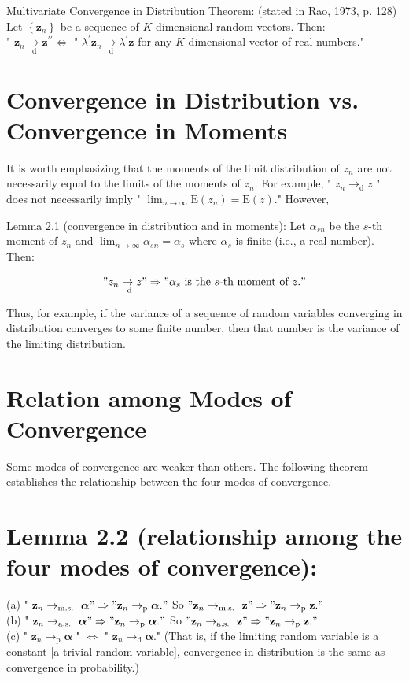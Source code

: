 \documentclass[10pt]{article}
\begin{document}
Multivariate Convergence in Distribution Theorem: (stated in Rao, 1973, p. 128) Let $\left\{\mathbf{z}_{n}\right\}$ be a sequence of $K$-dimensional random vectors. Then:\\
" $\mathbf{z}_{n} \xrightarrow[\mathrm{~d}]{ } \mathbf{z}^{\prime \prime} \Leftrightarrow$ " $\lambda^{\prime} \mathbf{z}_{n} \xrightarrow[\mathrm{~d}]{ } \lambda^{\prime} \mathbf{z}$ for any $K$-dimensional vector of real numbers."

\section*{Convergence in Distribution vs. Convergence in Moments}
It is worth emphasizing that the moments of the limit distribution of $z_{n}$ are not necessarily equal to the limits of the moments of $z_{n}$. For example, " $z_{n} \rightarrow_{\mathrm{d}} z$ " does not necessarily imply " $\lim _{n \rightarrow \infty} \mathrm{E}\left(z_{n}\right)=\mathrm{E}(z)$." However,

Lemma 2.1 (convergence in distribution and in moments): Let $\alpha_{s n}$ be the $s$-th moment of $z_{n}$ and $\lim _{n \rightarrow \infty} \alpha_{s n}=\alpha_{s}$ where $\alpha_{s}$ is finite (i.e., a real number). Then:

$$
" z_{n} \underset{\mathrm{~d}}{\rightarrow} z " \Rightarrow " \alpha_{s} \text { is the } s \text {-th moment of } z . "
$$

Thus, for example, if the variance of a sequence of random variables converging in distribution converges to some finite number, then that number is the variance of the limiting distribution.

\section*{Relation among Modes of Convergence}
Some modes of convergence are weaker than others. The following theorem establishes the relationship between the four modes of convergence.

\section*{Lemma 2.2 (relationship among the four modes of convergence):}
(a) " $\mathbf{z}_{n} \rightarrow_{\text {m.s. }} \boldsymbol{\alpha} " \Rightarrow " \mathbf{z}_{n} \rightarrow_{\mathrm{p}} \boldsymbol{\alpha} . "$ So $" \mathbf{z}_{n} \rightarrow_{\text {m.s. }} \mathbf{z} " \Rightarrow " \mathbf{z}_{n} \rightarrow_{\mathrm{p}} \mathbf{z} . "$\\
(b) " $\mathbf{z}_{n} \rightarrow_{\text {a.s. }} \boldsymbol{\alpha} " \Rightarrow " \mathbf{z}_{n} \rightarrow_{\mathrm{p}} \boldsymbol{\alpha} . "$ So $" \mathbf{z}_{n} \rightarrow_{\text {a.s. }} \mathbf{z} " \Rightarrow " \mathbf{z}_{n} \rightarrow_{\mathrm{p}} \mathbf{z} . "$\\
(c) " $\mathbf{z}_{n} \rightarrow_{\mathrm{p}} \boldsymbol{\alpha}$ " $\Leftrightarrow$ " $\mathbf{z}_{n} \rightarrow_{\mathrm{d}} \boldsymbol{\alpha}$." (That is, if the limiting random variable is a constant [a trivial random variable], convergence in distribution is the same as convergence in probability.)
\end{document}

